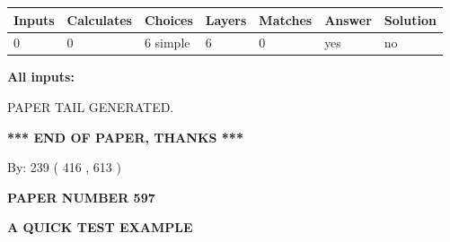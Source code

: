 \documentclass[12pt]{article}
\begin{document}
 
\noindent{}
 
 
   
   
   
   
\noindent\begin{tabular}{|l|l|l|l|l|l|l|}
 \hline
Inputs & Calculates & Choices & Layers & Matches & Answer & Solution \\ \hline
 0  & 
 0  & 
 6
  simple  
  & 
 6  & 
 0  & 
  yes & 
  no 
  \\ \hline
 \end{tabular}
   
   
   
   
\noindent{}
   
   
   
   
\noindent\vspace{0.1in}\hspace{-0.08in} {\textbf{\Large{All inputs: }}}
   
   
   
   
   
   
 \vspace{0.2in}
 
   
   
\vspace{2.0in} PAPER TAIL GENERATED.
   
   
   
   
\vspace{1.0in} 
{\textbf{\large{ *** END OF PAPER, THANKS *** }}} 
   
   
\hspace{1.0in} By: 
 239 ( 416 ,  613 )
   
   
   
   
\newpage 
\setcounter{page}{ 
   597001 } 
   
   
   
   
 {\textbf{ \Large{ PAPER NUMBER  597  }}}
   
   
\vspace{0.2in}
   
   
   
   
   
   
   
   
 \vspace{0.2in}
{\LARGE {\textbf{ A QUICK TEST EXAMPLE}}}
   
\end{document}
